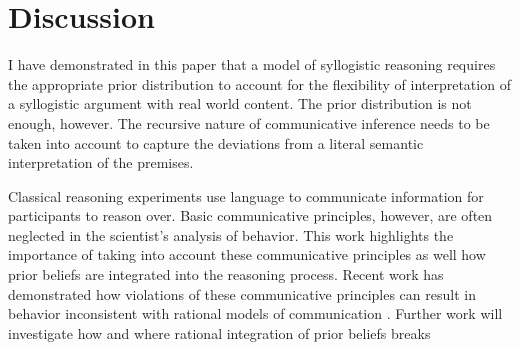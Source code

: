 \documentclass{llncs} %
\begin{document}
\section{Discussion}

I have demonstrated in this paper that a model of syllogistic reasoning requires the appropriate prior distribution to account for the flexibility of interpretation of a syllogistic argument with real world content. The prior distribution is not enough, however. The recursive nature of communicative inference needs to be taken into account to capture the deviations from a literal semantic interpretation of the premises. 

Classical reasoning experiments use language to communicate information for participants to reason over. Basic communicative principles, however, are often neglected in the scientist's analysis of behavior. This work highlights the importance of taking into account these communicative principles as well how prior beliefs are integrated into the reasoning process. Recent work has demonstrated how violations of these communicative principles can result in behavior inconsistent with rational models of communication \cite{Degen2015submitted}. Further work will investigate how and where rational integration of prior beliefs breaks 





\end{document}
